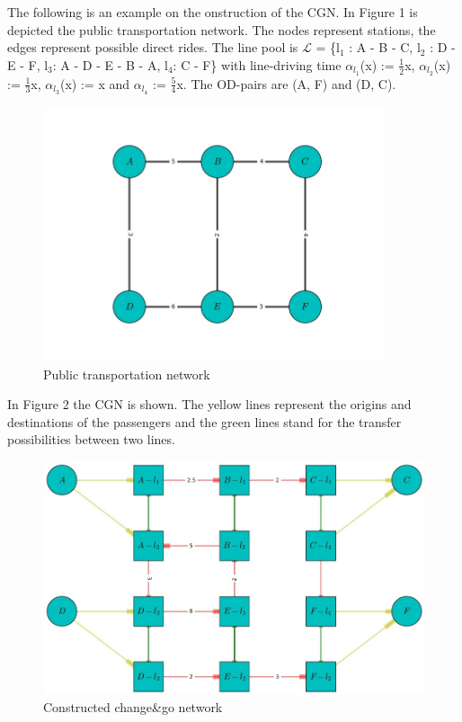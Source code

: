 \documentclass[
  twoside,
  12pt, a4paper,
  footinclude=true,
  headinclude=true,
  cleardoublepage=empty
]{scrbook}
\theoremstyle{definition}
\begin{document}
The following is an example on the onstruction of the CGN.\newline
In Figure 1 is depicted the public transportation network. The nodes represent stations, the edges represent possible direct rides.\newline
The line pool is $\mathcal{L}$ = \{l$_1$ : A - B - C, l$_2$ : D - E - F, l$_3$: A - D - E - B - A, l$_4$: C - F\} with line-driving time $\alpha_{l_1}$(x) := $\frac{1}{2}$x, $\alpha_{l_2}$(x) := $\frac{1}{3}$x, $\alpha_{l_3}$(x) := x and $\alpha_{l_4}$ := $\frac{5}{4}$x. The OD-pairs are (A, F) and (D, C). \newline
\begin{figure}[htbp]
\centering
\includegraphics[width=10cm]{esempio1.jpeg}%
\caption{Public transportation network}
\end{figure}
In Figure 2 the CGN is shown. The yellow lines represent the origins and destinations of the passengers and the green lines stand for the transfer possibilities between two lines.\newline
\begin{figure}[htbp]
\centering
\includegraphics[width=12cm]{figura1.jpg}%
\caption{Constructed change\&go network}
\end{figure}
\end{document}
